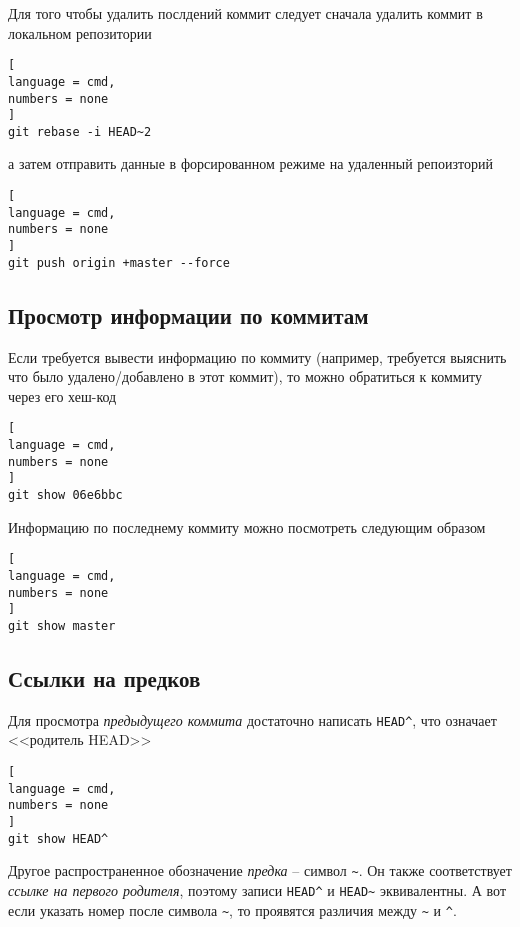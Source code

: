 \documentclass[%
	11pt,
	a4paper,
	utf8,
		]{article}
\begin{document}
Для того чтобы удалить послдений коммит следует сначала удалить коммит в локальном репозитории

\begin{lstlisting}[
language = cmd,
numbers = none
]
git rebase -i HEAD~2
\end{lstlisting}
а затем отправить данные в форсированном режиме на удаленный репоизторий

\begin{lstlisting}[
language = cmd,
numbers = none
]
git push origin +master --force
\end{lstlisting}




\subsection{Просмотр информации по коммитам}

Если требуется вывести информацию по коммиту (например, требуется выяснить что было удалено/добавлено в этот коммит), то можно обратиться к коммиту через его хеш-код

\begin{lstlisting}[
language = cmd,
numbers = none
]
git show 06e6bbc
\end{lstlisting}

Информацию по последнему коммиту можно посмотреть следующим образом

\begin{lstlisting}[
language = cmd,
numbers = none
]
git show master
\end{lstlisting}

\subsection{Ссылки на предков}

Для просмотра \emph{предыдущего коммита} достаточно написать \texttt{HEAD\^}, что означает <<родитель HEAD>>

\begin{lstlisting}[
language = cmd,
numbers = none
]
git show HEAD^
\end{lstlisting}


Другое распространенное обозначение \emph{предка} -- символ \lstinline{~}. Он также соответствует \emph{ссылке на первого родителя}, поэтому записи \lstinline{HEAD^} и \lstinline{HEAD~} эквивалентны. А вот если указать номер после символа \lstinline{~}, то проявятся различия между \lstinline{~} и \lstinline{^}.
\end{document}
